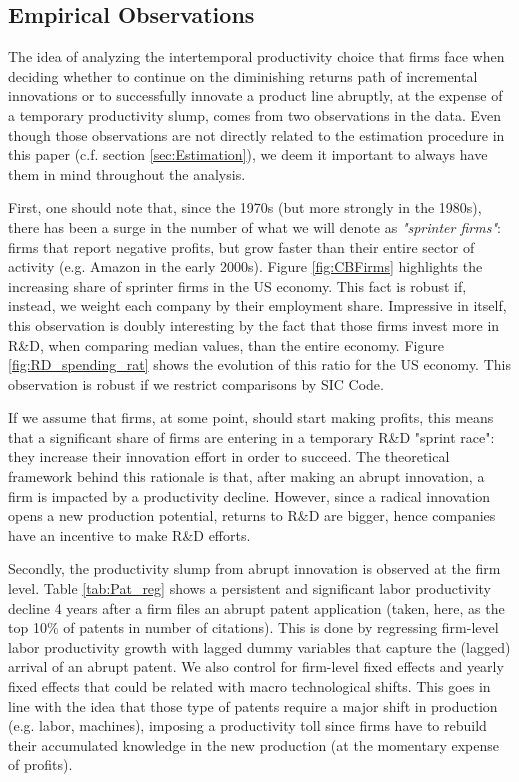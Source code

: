 \documentclass[letterpaper,12pt]{article}
\theoremstyle{definition}
\begin{document}
\subsection{Empirical Observations}

The idea of analyzing the intertemporal productivity choice that firms face when deciding whether to continue on the diminishing returns path of incremental innovations or to successfully innovate a product line abruptly, at the expense of a temporary productivity slump, comes from two observations in the data. Even though those observations are not directly related to the estimation procedure in this paper (c.f. section \ref{sec:Estimation}), we deem it important to always have them in mind throughout the analysis.

First, one should note that, since the 1970s (but more strongly in the 1980s), there has been a surge in the number of what we will denote as \textit{"sprinter firms"}: firms that report negative profits, but grow faster than their entire sector of activity (e.g. Amazon in the early 2000s). Figure \ref{fig:CBFirms} highlights the increasing share of sprinter firms in the US economy. This fact is robust if, instead, we weight each company by their employment share. Impressive in itself, this observation is doubly interesting by the fact that those firms invest more in R\&D, when comparing median values, than the entire economy. Figure \ref{fig:RD_spending_rat} shows the evolution of this ratio for the US economy. This observation is robust if we restrict comparisons by SIC Code.

If we assume that firms, at some point, should start making profits, this means that a significant share of firms are entering in a temporary R\&D "sprint race": they increase their innovation effort in order to succeed. The theoretical framework behind this rationale is that, after making an abrupt innovation, a firm is impacted by a productivity decline. However, since a radical innovation opens a new production potential, returns to R\&D are bigger, hence companies have an incentive to make R\&D efforts.

Secondly, the productivity slump from abrupt innovation is observed at the firm level. Table \ref{tab:Pat_reg} shows a persistent and significant labor productivity decline 4 years after a firm files an abrupt patent application (taken, here, as the top 10\% of patents in number of citations). This is done by regressing firm-level labor productivity growth with lagged dummy variables that capture the (lagged) arrival of an abrupt patent. We also control for firm-level fixed effects and yearly fixed effects that could be related with macro technological shifts. This goes in line with the idea that those type of patents require a major shift in production (e.g. labor, machines), imposing a productivity toll since firms have to rebuild their accumulated knowledge in the new production (at the momentary expense of profits).
\end{document}

